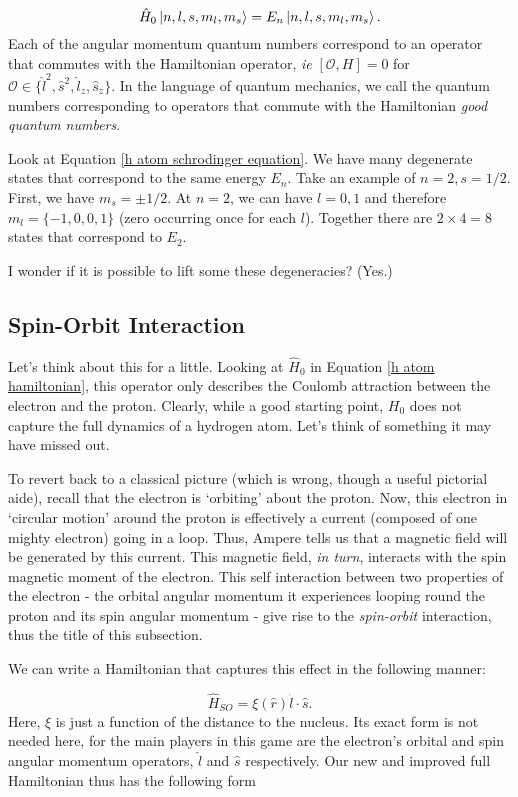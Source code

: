 \documentclass{article}
\numberwithin{equation}{section} %
\begin{document}
\begin{equation}
\hat{H}_0\ket{n,l,s,m_l,m_s} = E_n\ket{n,l,s,m_l,m_s}.
\label{h atom schrodinger equation}
\end{equation}
Each of the angular momentum quantum numbers correspond to an operator that commutes with the Hamiltonian operator, \textit{ie} $[\mathcal{O},H]=0$ for $\mathcal{O}\in\{\hat{l}^2,\hat{s}^2,\hat{l}_z,\hat{s}_z\}$. In the language of quantum mechanics, we call the quantum numbers corresponding to operators that commute with the Hamiltonian \textit{good quantum numbers}.

Look at Equation \ref{h atom schrodinger equation}. We have many degenerate states that correspond to the same energy $E_n$. Take an example of $n=2, s=1/2$. First, we have $m_s=\pm 1/2$. At $n=2$, we can have $l=0,1$ and therefore $m_l=\{-1,0,0,1\}$ (zero occurring once for each $l$). Together there are $2\times 4=8$ states that correspond to $E_2$.

I wonder if it is possible to lift some these degeneracies? (Yes.)

\subsection{Spin-Orbit Interaction}

Let's think about this for a little. Looking at $\hat{H}_0$ in Equation 
\ref{h atom hamiltonian}, this operator only describes the Coulomb attraction between the electron and the proton. Clearly, while a good starting point, $H_0$ does not capture the full dynamics of a hydrogen atom. Let's think of something it may have missed out.

To revert back to a classical picture (which is wrong, though a useful pictorial aide), recall that the electron is `orbiting' about the proton. Now, this electron in `circular motion' around the proton is effectively a current (composed of one mighty electron) going in a loop. Thus, Ampere tells us that a magnetic field will be generated by this current. This magnetic field, \textit{in turn}, interacts with the spin magnetic moment of the electron. This self interaction between two properties of the electron - the orbital angular momentum it experiences looping round the proton and its spin angular momentum - give rise to the \textit{spin-orbit} interaction, thus the title of this subsection.

We can write a Hamiltonian that captures this effect in the following manner:

\begin{equation}
\hat{H}_{SO}=\xi(\hat{r})\hat{l}\cdot\hat{s}.
\end{equation}
Here, $\xi$ is just a function of the distance to the nucleus. Its exact form is not needed here, for the main players in this game are the electron's orbital and spin angular momentum operators, $\hat{l}$ and $\hat{s}$ respectively. Our new and improved full Hamiltonian thus has the following form
\end{document}
